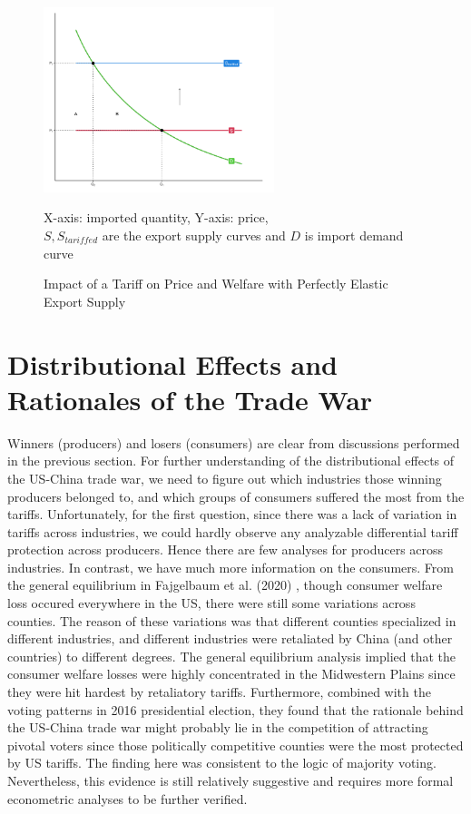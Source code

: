 \documentclass[12pt]{article}
\begin{document}
\begin{figure}[H]
    \centering
    \includegraphics[width = 0.6\textwidth]{tariff_welfare_flat.png}
    \caption{Impact of a Tariff on Price and Welfare with Perfectly Elastic Export Supply}
    {\footnotesize X-axis: imported quantity, Y-axis: price, \\ 
    $S, S_{tariffed}$ are the export supply curves and $D$ is import demand curve \par}
    \label{tariff_welfare_flat}
\end{figure}

\clearpage

\section{Distributional Effects and Rationales of the Trade War}
\label{sec:distributional}
Winners (producers) and losers (consumers) are clear from discussions performed in the previous section.
For further understanding of the distributional effects of the US-China trade war, we need to figure out which industries those winning producers belonged to, and which groups of consumers suffered the most from the tariffs. 
Unfortunately, for the first question, since there was a lack of variation in tariffs across industries, 
we could hardly observe any analyzable differential tariff protection across producers. Hence there are few analyses for producers across industries. 
In contrast, we have much more information on the consumers. 
From the general equilibrium in Fajgelbaum et al. (2020) \cite{fajgelbaum2020return}, 
though consumer welfare loss occured everywhere in the US, there were still some variations across counties. 
The reason of these variations was that different counties specialized in different industries, 
and different industries were retaliated by China (and other countries) to different degrees.
The general equilibrium analysis implied that the consumer welfare losses were highly concentrated in the Midwestern Plains since they were hit hardest by retaliatory tariffs.
Furthermore, combined with the voting patterns in 2016 presidential election, 
they found that the rationale behind the US-China trade war might probably lie in the competition of attracting pivotal voters since those politically competitive counties were the most protected by US tariffs.
The finding here was consistent to the logic of majority voting.
Nevertheless, this evidence is still relatively suggestive and requires more formal econometric analyses to be further verified.
\end{document}
